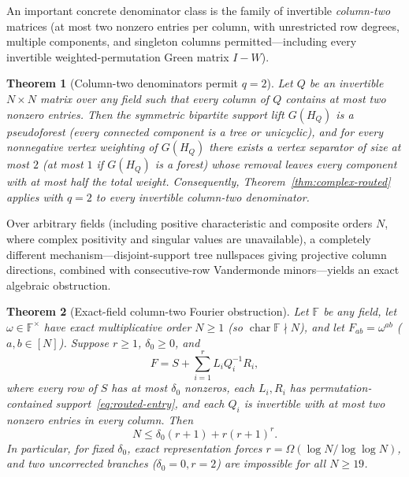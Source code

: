 \documentclass[11pt,reqno]{amsart}
\numberwithin{equation}{section}
\newtheorem{theorem}{Theorem}[section]
\theoremstyle{definition}
\theoremstyle{remark}
\newcommand{\F}{\mathbb{F}}
\begin{document}
An important concrete denominator class is the family of invertible \emph{column-two} matrices (at most two nonzero entries per column, with unrestricted row degrees, multiple components, and singleton columns permitted---including every invertible weighted-permutation Green matrix $I - W$).

\begin{theorem}[Column-two denominators permit $q=2$]
\label{thm:col2-sep}
Let $Q$ be an invertible $N\times N$ matrix over any field such that every column of $Q$ contains at most two nonzero entries. Then the symmetric bipartite support lift $G(H_Q)$ is a pseudoforest (every connected component is a tree or unicyclic), and for every nonnegative vertex weighting of $G(H_Q)$ there exists a vertex separator of size at most $2$ (at most $1$ if $G(H_Q)$ is a forest) whose removal leaves every component with at most half the total weight. Consequently, Theorem~\ref{thm:complex-routed} applies with $q=2$ to every invertible column-two denominator.
\end{theorem}

Over arbitrary fields (including positive characteristic and composite orders $N$, where complex positivity and singular values are unavailable), a completely different mechanism---disjoint-support tree nullspaces giving projective column directions, combined with consecutive-row Vandermonde minors---yields an exact algebraic obstruction.

\begin{theorem}[Exact-field column-two Fourier obstruction]
\label{thm:field-routed}
Let $\F$ be any field, let $\omega\in\F^\times$ have exact multiplicative order $N\ge 1$ (so $\operatorname{char}\F\nmid N$), and let $F_{ab}=\omega^{ab}$ ($a,b\in[N]$). Suppose $r\ge 1$, $\delta_0\ge 0$, and
\begin{equation}
\label{eq:field-model}
F = S + \sum_{i=1}^r L_i Q_i^{-1} R_i,
\end{equation}
where every row of $S$ has at most $\delta_0$ nonzeros, each $L_i,R_i$ has permutation-contained support~\eqref{eq:routed-entry}, and each $Q_i$ is invertible with at most two nonzero entries in every column. Then
\begin{equation}
\label{eq:field-cutoff}
N \le \delta_0(r + 1) + r(r + 1)^r.
\end{equation}
In particular, for fixed $\delta_0$, exact representation forces $r = \Omega(\log N / \log\log N)$, and two uncorrected branches ($\delta_0=0, r=2$) are impossible for all $N\ge 19$.
\end{theorem}
\end{document}
